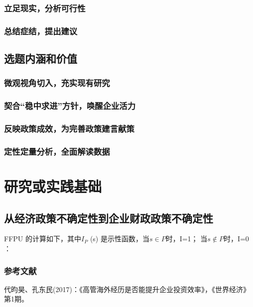 \documentclass [UTF8] {ctexart}
\begin{document}


\subsubsection{立足现实，分析可行性}





\subsubsection{总结症结，提出建议}

\subsection{选题内涵和价值}
\subsubsection{微观视角切入，充实现有研究}


\subsubsection{契合“稳中求进”方针，唤醒企业活力}


\subsubsection{反映政策成效，为完善政策建言献策}


\subsubsection{定性定量分析，全面解读数据}


\section{研究或实践基础}
\subsection{从经济政策不确定性到企业财政政策不确定性}


FFPU 的计算如下，其中$I_P$ (s) 是示性函数，当$s\in P$时，I=1； 当$s\notin P$时，I=0 ：


\subsubsection*{参考文献}
代昀昊、孔东民(2017)：《高管海外经历是否能提升企业投资效率》，《世界经济》第1期。
\end{document}
